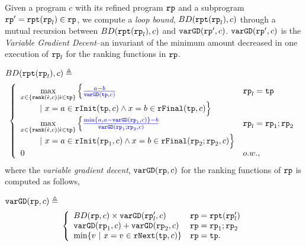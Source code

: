 \begin{defn}
\label{def:loopbound}
Given a program $c$ with its refined program $\mathtt{rp}$ and a subprogram $\mathtt{rp}' = \mathtt{rpt}(\mathtt{rp}_l) \in \mathtt{rp}$, we compute a \emph{loop bound}, $BD(\mathtt{rpt}(\mathtt{rp}_l), c)$
through a mutual recursion between  $BD(\mathtt{rpt}(\mathtt{rp}_l), c)$ and $\mathtt{varGD}(\mathtt{rp}', c)$.
$\mathtt{varGD}(\mathtt{rp}', c)$ is the \emph{Variable Gradient Decent}--an invariant of the minimum amount decreased in one execution of $\mathtt{rp}_l$ for the ranking functions in $\mathtt{rp}$.

$BD(\mathtt{rpt}(\mathtt{rp}_l), c)\triangleq$
 \[
 \left\{ 
 \begin{array}{ll}
 \max\limits_{x \in \left\{ \rank(\absevent, c) | \absevent \in \tpath \right\}} 
 \Big\{ \highlight{\frac{a - b}{\varGD(\tpath, c)}} & \rprog_l = \tpath
 \\ \qquad 
 ~\vert~
 x = a \in \rfinit(\tpath, c)
 \land x = b \in \rffinal(\tpath, c)
 \Big\} 
 \\
 \max\limits_{x \in \left\{ \rank(\absevent, c) | \absevent \in \tpath \right\}} 
 \Big\{ \highlight{\frac{\min\{ a, a - \varGD(\rprog_1, c) \} - b}{\varGD(\rprog_1;\rprog_2, c)}} 
 & \rprog_l = \rprog_1;\rprog_2
 \\ \qquad 
 ~\vert~
 x = a \in \rfinit(\rprog_1, c)
 \land x = b \in \rffinal(\rprog_2;\rprog_2, c)
 \Big\} \\
 0 & o.w.,
 \end{array} 
 \right.
\]
where the \emph{variable gradient decent},
$\mathtt{varGD}(\mathtt{rp}, c)$ for the ranking functions of $\mathtt{rp}$ is computed as follows,

$ \mathtt{varGD}(\mathtt{rp}, c) \triangleq$
\[
 \left\{
 \begin{array}{ll}
 BD(\rprog, c) \times {\varGD(\rprog_l', c)} & \rprog = \rprepeat(\rprog_l') \\
 \varGD(\rprog_1, c) + \varGD(\rprog_2, c) & \rprog = \rprog_1;\rprog_2 \\
 \min\left\{v ~|~ x = v \in \rfnext(\tpath, c) \right\} & \rprog = \tpath.
 \end{array}
 \right.
 \]


\end{defn}
